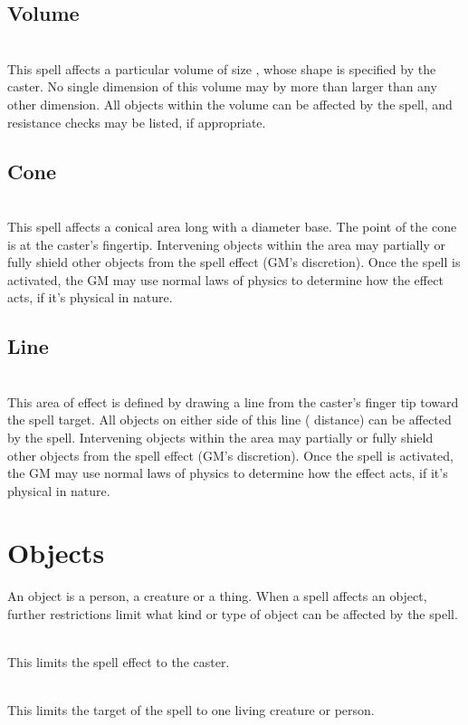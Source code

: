 \begin{multicols*}{2}
\subsection{Volume}
\\
This spell affects a particular volume of size , whose shape is specified by the caster. No single dimension of this volume may by more than  larger than any other dimension. All objects within the volume can be affected by the spell, and resistance checks may be listed, if appropriate.
\subsection{Cone}
\\
This spell affects a conical area  long with a  diameter base. The point of the cone is at the caster's fingertip. Intervening objects within the area may partially or fully shield other objects from the spell effect (GM's discretion). Once the spell is activated, the GM may use normal laws of physics to determine how the effect acts, if it's physical in nature.
\subsection{Line}
\\
This area of effect is defined by drawing a line from the caster's finger tip  toward the spell target. All objects  on either side of this line ( distance) can be affected by the spell. Intervening objects within the area may partially or fully shield other objects from the spell effect (GM's discretion). Once the spell is activated, the GM may use normal laws of physics to determine how the effect acts, if it's physical in nature.
\section{Objects}
An object is a person, a creature or a thing. When a spell affects an object, further restrictions limit what kind or type of object can be affected by the spell.

\\
This limits the spell effect to the caster.

\\
This limits the target of the spell to one living creature or person.


\end{multicols*}
